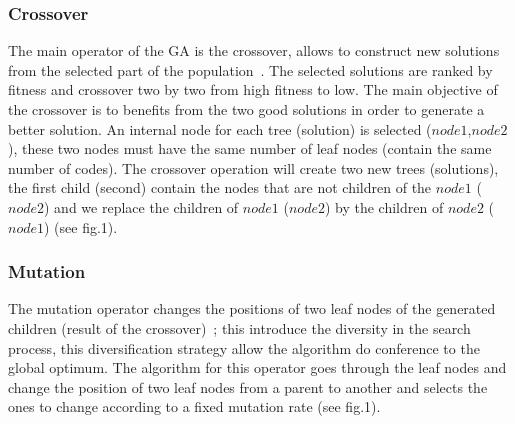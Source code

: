 \documentclass[preprint,12pt]{elsarticle}
\begin{document}
\subsubsection{Crossover}
The main operator of the GA is the crossover, allows to construct new solutions from the selected part of the population~\cite{osa14}. The selected solutions are ranked by fitness and crossover two by two from high fitness to low. The main objective of the crossover is to benefits from the two good solutions in order to generate a better solution. An internal node for each tree (solution) is selected (\textit{$node1$},\textit{$node2$}), these two nodes must have the same number of leaf nodes (contain the same number of codes). The crossover operation will create two new trees (solutions), the first child (second) contain the nodes that are not children of the \textit{$node1$} (\textit{$node2$}) and we replace the children of \textit{$node1$} (\textit{$node2$}) by the children of \textit{$node2$} (\textit{$node1$}) (see fig.1). 
\subsubsection{Mutation}
The mutation operator changes the positions of two leaf nodes of the generated children (result of the crossover)~\cite{muhlenbein1992genetic}; this introduce the diversity in the search process, this diversification strategy allow the algorithm do conference to the global optimum. The algorithm for this operator goes through the leaf nodes and change the position of two leaf nodes from a parent to another and selects the ones to change according to a fixed mutation rate (see fig.1).
\end{document}
